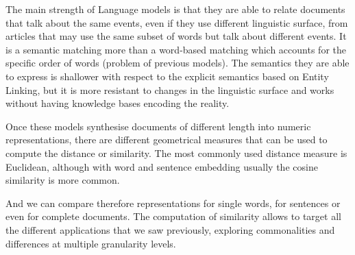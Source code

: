 The main strength of Language models is that they are able to
relate documents that talk about the same events, even if they use different linguistic surface, from articles that may use the same subset of words but talk about different events.
It is a semantic matching more than a word-based matching which accounts for the specific order of words (problem of previous models). 
The semantics they are able to express
is shallower with respect to the explicit semantics based on Entity Linking, but it is more resistant to changes in the linguistic surface and works without having knowledge bases encoding the reality.










Once these models synthesise documents of different length into numeric representations, there are different geometrical measures that can be used to compute the distance or similarity.
The most commonly used distance measure is Euclidean, although with word and sentence embedding usually the cosine similarity is more common.

And we can compare therefore representations for single words, for sentences or even for complete documents.
The computation of similarity allows to target all the different applications that we saw previously, exploring commonalities and differences at multiple granularity levels.







